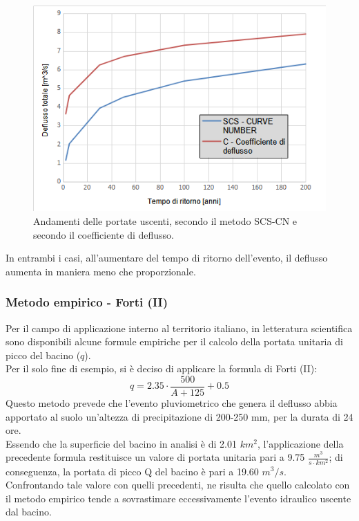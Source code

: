 \begin{figure}[H]  \centering
    \includegraphics[scale=0.75]{immagini/metodo_razionale_cn_c.png}
    \caption{Andamenti delle portate uscenti, secondo il metodo SCS-CN e secondo il coefficiente di deflusso.}
    \label{metodo_razionale_cn_c}
\end{figure}
In entrambi i casi, all'aumentare del tempo di ritorno dell'evento, il deflusso aumenta in maniera meno che proporzionale.

\subsubsection{Metodo empirico - Forti (II)}
Per il campo di applicazione interno al territorio italiano, in letteratura scientifica sono disponibili alcune formule empiriche per il calcolo della portata unitaria di picco del bacino ($q$).\\
Per il solo fine di esempio, si è deciso di applicare la formula di Forti (II):
\begin{equation}
    q = 2.35 \cdot \frac{500}{A+125}+0.5
\end{equation}
Questo metodo prevede che l'evento pluviometrico che genera il deflusso abbia apportato al suolo un'altezza di precipitazione di 200-250 mm, per la durata di 24 ore.\\
Essendo che la superficie del bacino in analisi è di 2.01 $km^2$, l'applicazione della precedente formula restituisce un valore di portata unitaria pari a 9.75 $\frac{m^3}{s \cdot km^2}$; di conseguenza, la portata di picco Q del bacino è pari a 19.60 $m^3/s$.\\
Confrontando tale valore con quelli precedenti, ne risulta che quello calcolato con il metodo empirico tende a sovrastimare eccessivamente l'evento idraulico uscente dal bacino.

